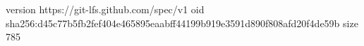 version https://git-lfs.github.com/spec/v1
oid sha256:d45c77b5fb2fef404e465895eaabff44199b919e3591d890f808afd20f4de59b
size 785
